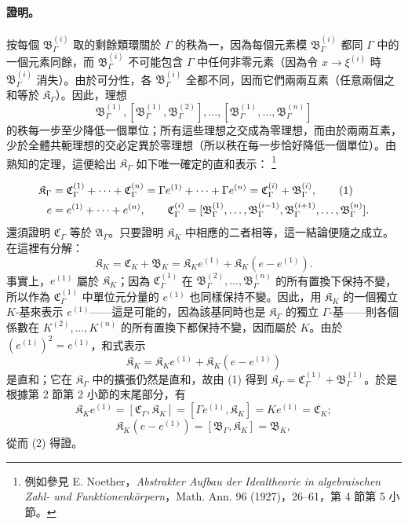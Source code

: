 \documentclass[11pt]{article}
\providecommand{\srcfn}[2]{%
  \begingroup
  \renewcommand{\thefootnote}{#1}%
  \footnote{#2}%
  \addtocounter{footnote}{-1}%
  \endgroup}
\begin{document}
\paragraph{證明。}
按每個 $\mathfrak B_\Gamma^{(i)}$ 取的剩餘類環關於 $\Gamma$ 的秩為一，因為每個元素模 $\mathfrak B_\Gamma^{(i)}$ 都同 $\Gamma$ 中的一個元素同餘，而 $\mathfrak B_\Gamma^{(i)}$ 不可能包含 $\Gamma$ 中任何非零元素（因為令 $x\to\xi^{(i)}$ 時 $\mathfrak B_\Gamma^{(i)}$ 消失）。由於可分性，各 $\mathfrak B_\Gamma^{(i)}$ 全都不同，因而它們兩兩互素（任意兩個之和等於 $\mathfrak K_\Gamma$）。因此，理想
\[
\mathfrak B_\Gamma^{(1)},
[\mathfrak B_\Gamma^{(1)},\mathfrak B_\Gamma^{(2)}],\ldots,
[\mathfrak B_\Gamma^{(1)},\ldots,\mathfrak B_\Gamma^{(n)}]
\]
的秩每一步至少降低一個單位；所有這些理想之交成為零理想，而由於兩兩互素，少於全體共軛理想的交必定異於零理想（所以秩在每一步恰好降低一個單位）。由熟知的定理，這便給出 $\mathfrak K_\Gamma$ 如下唯一確定的直和表示：\srcfn{17)}{例如參見 E. Noether，\emph{Abstrakter Aufbau der Idealtheorie in algebraischen Zahl- und Funktionenkörpern}，Math. Ann. 96 (1927)，26--61，第 4 節第 5 小節。}
\begin{align}
\mathfrak K_\Gamma
&=\mathfrak C_\Gamma^{(1)}+\cdots+\mathfrak C_\Gamma^{(n)}
=\Gamma e^{(1)}+\cdots+\Gamma e^{(n)}
=\mathfrak C_\Gamma^{(i)}+\mathfrak B_\Gamma^{(i)}, \tag{1}\\
e&=e^{(1)}+\cdots+e^{(n)},\qquad
\mathfrak C_\Gamma^{(i)}=
[\mathfrak B_\Gamma^{(1)},\ldots,\mathfrak B_\Gamma^{(i-1)},
\mathfrak B_\Gamma^{(i+1)},\ldots,\mathfrak B_\Gamma^{(n)}].\notag
\end{align}
還須證明 $\mathfrak C_\Gamma$ 等於 $\mathfrak A_\Gamma$。只要證明 $\mathfrak K_K$ 中相應的二者相等，這一結論便隨之成立。在這裡有分解：
\begin{equation}
\mathfrak K_K=\mathfrak C_K+\mathfrak B_K
=\mathfrak K_K e^{(1)}+\mathfrak K_K(e-e^{(1)}). \tag{2}
\end{equation}
事實上，$e^{(1)}$ 屬於 $\mathfrak K_K$；因為 $\mathfrak C_\Gamma^{(1)}$ 在 $\mathfrak B_\Gamma^{(2)},\ldots,\mathfrak B_\Gamma^{(n)}$ 的所有置換下保持不變，所以作為 $\mathfrak C_\Gamma^{(1)}$ 中單位元分量的 $e^{(1)}$ 也同樣保持不變。因此，用 $\mathfrak K_K$ 的一個獨立 $K$-基來表示 $e^{(1)}$——這是可能的，因為該基同時也是 $\mathfrak K_\Gamma$ 的獨立 $\Gamma$-基——則各個係數在 $K^{(2)},\ldots,K^{(n)}$ 的所有置換下都保持不變，因而屬於 $K$。由於 $(e^{(1)})^2=e^{(1)}$，和式表示
\[
\mathfrak K_K=\mathfrak K_K e^{(1)}+\mathfrak K_K(e-e^{(1)})
\]
是直和；它在 $\mathfrak K_\Gamma$ 中的擴張仍然是直和，故由 (1) 得到 $\mathfrak K_\Gamma=\mathfrak C_\Gamma^{(1)}+\mathfrak B_\Gamma^{(1)}$。於是根據第 2 節第 2 小節的末尾部分，有
\[
\mathfrak K_K e^{(1)}=[\mathfrak C_\Gamma,\mathfrak K_K]
=[\Gamma e^{(1)},\mathfrak K_K]=Ke^{(1)}=\mathfrak C_K;
\]
\[
\mathfrak K_K(e-e^{(1)})=[\mathfrak B_\Gamma,\mathfrak K_K]=\mathfrak B_K,
\]
從而 (2) 得證。
\end{document}
